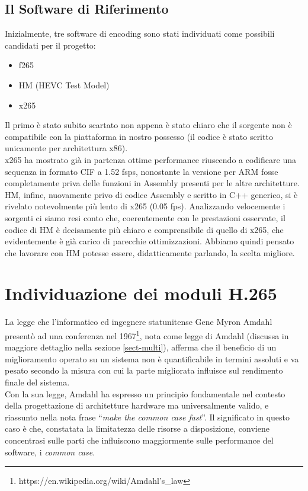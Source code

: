 \subsection{Il Software di Riferimento}
Inizialmente, tre software di encoding sono stati individuati come possibili
candidati per il progetto:
\begin{itemize}
	\item f265
	\item HM (HEVC Test Model)
	\item x265
\end{itemize}
Il primo è stato subito scartato non appena è stato chiaro che il sorgente non 
è compatibile con la piattaforma in nostro possesso (il codice è stato scritto 
unicamente per architettura x86).\\
x265 ha mostrato già in partenza ottime performance riuscendo a 
codificare una sequenza in formato CIF a 1.52 fsps, nonostante la versione per 
ARM fosse completamente priva delle funzioni in Assembly presenti per le altre 
architetture.\\
HM, infine, nuovamente privo di codice Assembly e scritto in C++ generico, si è 
rivelato notevolmente più lento di x265 (0.05 fps). Analizzando velocemente i 
sorgenti 
ci siamo resi conto che, coerentemente con le prestazioni osservate, il codice 
di HM è decisamente più chiaro e comprensibile di quello di x265, che 
evidentemente è già carico di parecchie ottimizzazioni. Abbiamo quindi pensato 
che 
lavorare con HM potesse essere, didatticamente parlando, la scelta migliore.
\section{Individuazione dei moduli H.265}
La legge che l'informatico ed ingegnere statunitense Gene Myron Amdahl presentò 
ad una conferenza nel 
1967\footnote{https://en.wikipedia.org/wiki/Amdahl's\_law}, nota come legge di 
Amdahl (discussa in maggiore dettaglio nella sezione \ref{sect-multi}), afferma 
che il beneficio di un miglioramento operato su un sistema non è quantificabile 
in termini assoluti e va pesato secondo la misura con cui la parte migliorata 
influisce sul rendimento finale del sistema. \\
Con la sua legge, Amdahl ha espresso un principio fondamentale nel contesto 
della progettazione di architetture hardware ma universalmente valido, e 
riassunto nella nota frase ``\emph{make the common case fast}''. Il significato 
in questo caso è che, constatata la limitatezza delle risorse a disposizione, 
conviene concentrasi sulle parti che influiscono maggiormente sulle performance 
del software, i \emph{common case}.

